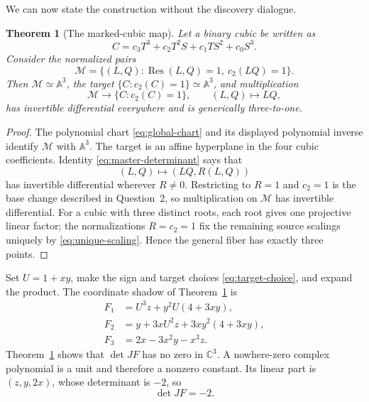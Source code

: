 \documentclass[11pt,a4paper]{article}
\numberwithin{equation}{section}
\newtheorem{theorem}{Theorem}[section]
\theoremstyle{definition}
\theoremstyle{remark}
\DeclareMathOperator{\Res}{Res}
\newcommand{\A}{\mathbb A}
\newcommand{\C}{\mathbb C}
\begin{document}
We can now state the construction without the discovery dialogue.

\begin{theorem}[The marked-cubic map]\label{thm:conceptual}
Let a binary cubic be written as
\[
  C=c_3T^3+c_2T^2S+c_1TS^2+c_0S^3.
\]
Consider the normalized pairs
\begin{equation}\label{eq:M}
 \mathcal M=\{(L,Q):\Res(L,Q)=1,\ c_2(LQ)=1\}.
\end{equation}
Then \(\mathcal M\simeq\A^3\), the target
\(\{C:c_2(C)=1\}\simeq\A^3\), and multiplication
\[
  \mathcal M\longrightarrow\{C:c_2(C)=1\},
  \qquad (L,Q)\longmapsto LQ,
\]
has invertible differential everywhere and is generically three-to-one.
\end{theorem}

\begin{proof}
The polynomial chart \eqref{eq:global-chart} and its displayed polynomial
inverse identify \(\mathcal M\) with \(\A^3\).  The target is an affine
hyperplane in the four cubic coefficients.  Identity
\eqref{eq:master-determinant} says that
\[
 (L,Q)\longmapsto(LQ,R(L,Q))
\]
has invertible differential wherever \(R\ne0\).  Restricting to
\(R=1\) and \(c_2=1\) is the base change described in Question~2, so
multiplication on \(\mathcal M\) has invertible differential.  For a cubic
with three distinct roots, each root gives one projective linear factor; the
normalizations \(R=c_2=1\) fix the remaining source scalings uniquely by
\eqref{eq:unique-scaling}.  Hence the general fiber has exactly three points.
\end{proof}

Set \(U=1+xy\), make the sign and target choices
\eqref{eq:target-choice}, and expand the product.  The coordinate shadow of
Theorem~\ref{thm:conceptual} is
\begin{equation}\label{eq:final-map}
\boxed{
\begin{aligned}
F_1&=U^3z+y^2U(4+3xy),\\
F_2&=y+3xU^2z+3xy^2(4+3xy),\\
F_3&=2x-3x^2y-x^3z.
\end{aligned}}
\end{equation}
Theorem~\ref{thm:conceptual} shows that \(\det JF\) has no zero in \(\C^3\).
A nowhere-zero complex polynomial is a unit and therefore a nonzero constant.
Its linear part is \((z,y,2x)\), whose determinant is \(-2\), so
\begin{equation}\label{eq:jacobian}
  \det JF=-2.
\end{equation}
\end{document}
